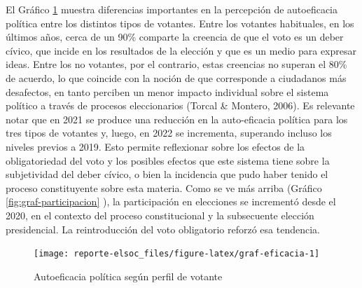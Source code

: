 \documentclass[
  12pt,
]{book}
\begin{document}
El Gráfico \ref{fig:graf-eficacia} muestra diferencias importantes en la percepción de autoeficacia política entre los distintos tipos de votantes. Entre los votantes habituales, en los últimos años, cerca de un 90\% comparte la creencia de que el voto es un deber cívico, que incide en los resultados de la elección y que es un medio para expresar ideas. Entre los no votantes, por el contrario, estas creencias no superan el 80\% de acuerdo, lo que coincide con la noción de que corresponde a ciudadanos más desafectos, en tanto perciben un menor impacto individual sobre el sistema político a través de procesos eleccionarios (Torcal \& Montero, 2006). Es relevante notar que en 2021 se produce una reducción en la auto-eficacia política para los tres tipos de votantes y, luego, en 2022 se incrementa, superando incluso los niveles previos a 2019. Esto permite reflexionar sobre los efectos de la obligatoriedad del voto y los posibles efectos que este sistema tiene sobre la subjetividad del deber cívico, o bien la incidencia que pudo haber tenido el proceso constituyente sobre esta materia. Como se ve más arriba (Gráfico \ref{fig:graf-participacion} ), la participación en elecciones se incrementó desde el 2020, en el contexto del proceso constitucional y la subsecuente elección presidencial. La reintroducción del voto obligatorio reforzó esa tendencia.

\begin{figure}

{\centering \texttt{[image: reporte-elsoc\_files/figure-latex/graf-eficacia-1]} 

}

\caption{Autoeficacia política según perfil de votante}\label{fig:graf-eficacia}
\end{figure}
\end{document}
